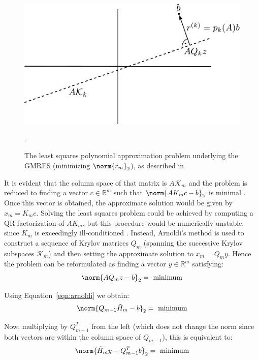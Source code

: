\begin{figure}[h]
    \centering
    \includegraphics[width=0.7\linewidth]{figures/GMRES.pdf}
    \caption{The least squares polynomial approximation problem underlying the GMRES (minimizing $\norm{r_m}_2$), as described in \cite{trefethen_numerical_1997}}.
    \label{fig:gmres}
\end{figure}

\noindent It is evident that the column space of that matrix is $A\mathcal{K}_m$ and the problem is reduced to finding a vector $c \in \mathbb{R}^{m}$ such that $\norm{AK_mc-b}_2$ is minimal   \cite{trefethen_numerical_1997}. Once this vector is obtained, the approximate solution would be given by $x_m =K_mc$. Solving the least squares problem could be achieved by computing a QR factorization of $AK_m$, but this procedure would be numerically unstable, since $K_m$ is exceedingly ill-conditioned \cite{trefethen_numerical_1997}. Instead, Arnoldi's method is used to construct a sequence of Krylov matrices $Q_m$ (spanning the successive Krylov subspaces $\mathcal{K}_m$) and then setting the approximate solution to $x_m = Q_my$. Hence the problem can be reformulated as finding a vector $y \in \mathbb{R}^m$ satisfying:
\begin{equation}
    \norm{AQ_mz-b}_2=\text{ minimum}
\end{equation}

\noindent Using Equation~\hyperref[eqn:arnoldi]{\ref{eqn:arnoldi}} we obtain:
\begin{equation}
    \norm{Q_{m-1}\tilde{H}_m-b}_2=\text{ minimum}
\end{equation}

\noindent Now, multiplying by $Q^T_{m-1}$ from the left (which does not change the norm since both vectors are within the column space of $Q_{m-1}$), this is equivalent to:
\begin{equation}
    \norm{\tilde{H}_my-Q^T_{m-1}b}_2 = \text{ minimum}
\end{equation}

